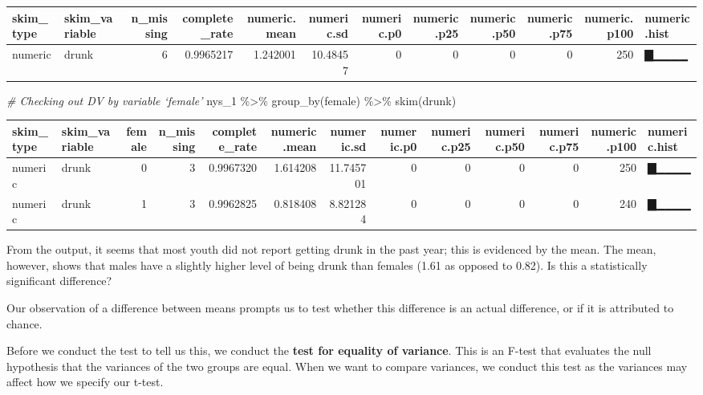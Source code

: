 \documentclass[
]{book}
\newenvironment{Shaded}{\begin{snugshade}}{\end{snugshade}}
\newcommand{\CommentTok}[1]{\textcolor[rgb]{0.56,0.35,0.01}{\textit{#1}}}
\newcommand{\FunctionTok}[1]{\textcolor[rgb]{0.00,0.00,0.00}{#1}}
\newcommand{\NormalTok}[1]{#1}
\newcommand{\SpecialCharTok}[1]{\textcolor[rgb]{0.00,0.00,0.00}{#1}}
\begin{document}
\begin{tabular}{l|l|r|r|r|r|r|r|r|r|r|l}
\hline
skim\_type & skim\_variable & n\_missing & complete\_rate & numeric.mean & numeric.sd & numeric.p0 & numeric.p25 & numeric.p50 & numeric.p75 & numeric.p100 & numeric.hist\\
\hline
numeric & drunk & 6 & 0.9965217 & 1.242001 & 10.48457 & 0 & 0 & 0 & 0 & 250 & ▇▁▁▁▁\\
\hline
\end{tabular}

\begin{Shaded}
\begin{Highlighting}[]
\CommentTok{\# Checking out DV by variable ‘female’}
\NormalTok{nys\_1 }\SpecialCharTok{\%\textgreater{}\%} \FunctionTok{group\_by}\NormalTok{(female) }\SpecialCharTok{\%\textgreater{}\%} \FunctionTok{skim}\NormalTok{(drunk)}
\end{Highlighting}
\end{Shaded}

\begin{tabular}{l|l|r|r|r|r|r|r|r|r|r|r|l}
\hline
skim\_type & skim\_variable & female & n\_missing & complete\_rate & numeric.mean & numeric.sd & numeric.p0 & numeric.p25 & numeric.p50 & numeric.p75 & numeric.p100 & numeric.hist\\
\hline
numeric & drunk & 0 & 3 & 0.9967320 & 1.614208 & 11.745701 & 0 & 0 & 0 & 0 & 250 & ▇▁▁▁▁\\
\hline
numeric & drunk & 1 & 3 & 0.9962825 & 0.818408 & 8.821284 & 0 & 0 & 0 & 0 & 240 & ▇▁▁▁▁\\
\hline
\end{tabular}

From the output, it seems that most youth did not report getting drunk in the past year; this is evidenced by the mean. The mean, however, shows that males have a slightly higher level of being drunk than females (1.61 as opposed to 0.82). Is this a statistically significant difference?

Our observation of a difference between means prompts us to test whether this difference is an actual difference, or if it is attributed to chance.

Before we conduct the test to tell us this, we conduct the \textbf{test for equality of variance}. This is an F-test that evaluates the null hypothesis that the variances of the two groups are equal. When we want to compare variances, we conduct this test as the variances may affect how we specify our t-test.

\begin{Shaded}
\end{Shaded}
\end{document}
